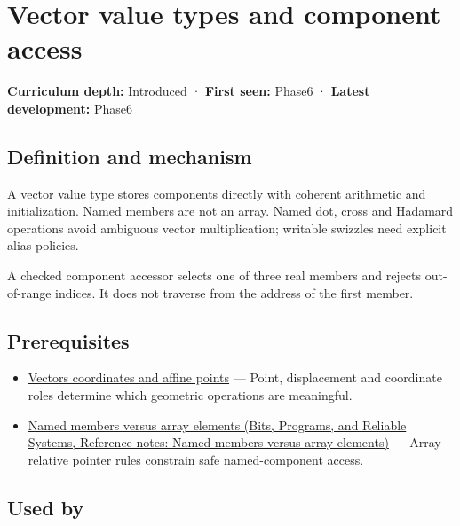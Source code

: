 \hypertarget{appendix-37a39984ba66}{}\label{referencestart:appendix-37a39984ba66}
\section{Vector value types and component access}\label{appendix-37a39984ba66-vector-value-types-and-component-access}

\textbf{Curriculum depth:} Introduced · \textbf{First seen:} Phase6 · \textbf{Latest development:} Phase6

\begin{allmightroledefinition}

\subsection{Definition and mechanism}\label{appendix-37a39984ba66-definition-and-mechanism}

A vector value type stores components directly with coherent arithmetic and initialization. Named members are not an array. Named dot, cross and Hadamard operations avoid ambiguous vector multiplication; writable swizzles need explicit alias policies.

\end{allmightroledefinition}

A checked component accessor selects one of three real members and rejects out-of-range indices. It does not traverse from the address of the first member.

\subsection{Prerequisites}\label{appendix-37a39984ba66-prerequisites}

\begin{itemize}
\tightlist
\item
  \hyperref[appendix-0659864c0aa3]{Vectors coordinates and affine points} --- Point, displacement and coordinate roles determine which geometric operations are meaningful.
\item
  \href{../01-Bits-Programs-and-Reliable-Systems/main.pdf\#nameddest=appendix-3f7e15effba6}{Named members versus array elements (Bits, Programs, and Reliable Systems, Reference notes: Named members versus array elements)} --- Array-relative pointer rules constrain safe named-component access.
\end{itemize}

\subsection{Used by}\label{appendix-37a39984ba66-used-by}


